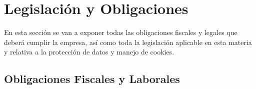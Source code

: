 \section{Legislación y Obligaciones}
En esta sección se van a exponer todas las obligaciones fiscales y legales que deberá cumplir la empresa, así como toda la legislación aplicable en esta materia y relativa a la protección de datos y manejo de cookies.

\subsection{Obligaciones Fiscales y Laborales}





%

